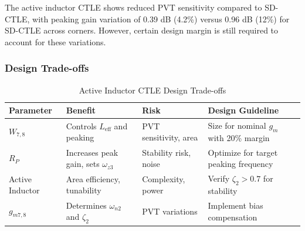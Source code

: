 The active inductor CTLE shows reduced PVT sensitivity compared to SD-CTLE, with peaking gain variation of 0.39 dB (4.2\%) versus 0.96 dB (12\%) for SD-CTLE across corners. However, certain design margin is still required to account for these variations.

\subsubsection*{Design Trade-offs}

\begin{table}[htbp]
\centering
\caption{Active Inductor CTLE Design Trade-offs}
\label{tab:active_ind_tradeoffs}
\begin{tabular}{ >{\raggedright\arraybackslash}p{} 
                 >{\raggedright\arraybackslash}p{} 
                 >{\raggedright\arraybackslash}p{} 
                 >{\raggedright\arraybackslash}p{} }
\toprule
\textbf{Parameter} & \textbf{Benefit} & \textbf{Risk} & \textbf{Design Guideline} \\
\midrule
$W_{7,8}$ & Controls $L_{\text{eff}}$ and peaking & PVT sensitivity, area & Size for nominal $g_m$ with 20\% margin \\
\midrule
$R_P$ & Increases peak gain, sets $\omega_{z3}$ & Stability risk, noise & Optimize for target peaking frequency \\
\midrule
Active Inductor & Area efficiency, tunability & Complexity, power & Verify $\zeta_2 > 0.7$ for stability \\
\midrule
$g_{m7,8}$ & Determines $\omega_{n2}$ and $\zeta_2$ & PVT variations & Implement bias compensation \\
\bottomrule
\end{tabular}
\end{table}